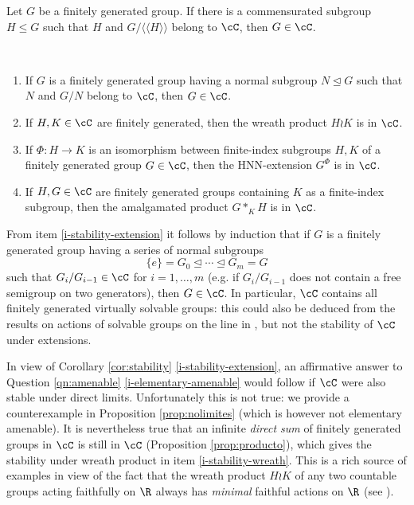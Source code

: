 \documentclass[reqno]{amsart}
\begin{document}
\begin{thmA} \label{teo:stability}
	Let $G$ be a finitely generated group. If there is a commensurated subgroup $H \le G$ such that $H$ and $G/ \langle \langle H \rangle \rangle$ belong to $\cC$, then $G \in \cC$.
\end{thmA}
	
	
\begin{cor} \label{cor:stability}
	    \ 
\begin{enumerate}


	\item \label{i-stability-extension} If $G$ is a finitely generated group  having a normal subgroup $N \unlhd G$ such that $N$ and $G/ N$ belong to $\cC$, then $G \in \cC$. 
	\item \label{i-stability-wreath} If $H, K\in \cC$ are finitely generated, then the wreath product $H\wr K$ is in $\cC$.
	\item \label{i-stability-HNN} If $\Phi \colon H \to K$ is an isomorphism between finite-index subgroups $H,K$ of  a finitely generated group $G\in \cC$, then the HNN-extension $G^\Phi$ is in $\cC$.
	\item \label{i-stability-amalgamated} If $H, G \in \cC$ are finitely generated groups containing $K$ as a finite-index subgroup, then the amalgamated product $G \ast_K H$ is in $\cC$.
\end{enumerate}
	\end{cor}

\begin{ejm}
From item \eqref{i-stability-extension} it follows by induction that if $G$ is a finitely generated group having a series of normal subgroups
\[\{e\}=G_0\unlhd \cdots \unlhd G_m=G\]
such that $G_{i}/G_{i-1}\in \cC$ for $i=1,\ldots, m$ (e.g. if $G_{i}/G_{i-1}$ does not contain a free semigroup on two generators), then $G\in \cC$. In particular, $\cC$ contains all finitely generated virtually solvable groups: this could also be deduced from the results on actions of solvable groups on the line in \cite[Theorem B]{BrumMatteBonRivasTriestino2025}, but not the stability of $\cC$ under extensions. 

\end{ejm}
In view of Corollary \ref{cor:stability} \eqref{i-stability-extension}, an affirmative answer to Question \ref{qn:amenable} \eqref{i-elementary-amenable} would follow if $\cC$ were also stable under direct limits. Unfortunately this is not true: we provide a counterexample in Proposition \ref{prop:nolimites} (which is however not elementary amenable). It is nevertheless true that an infinite \emph{direct sum} of finitely generated groups in $\cC$ is still in $\cC$ (Proposition \ref{prop:producto}), which gives the stability under wreath product in item \eqref{i-stability-wreath}. This is a rich source of examples in view of the fact that the wreath product $H\wr K$ of any two countable groups acting faithfully on $\R$ always has \emph{minimal} faithful actions on $\R$ (see \cite[Example 8.1.8]{BMRT}).
\end{document}
